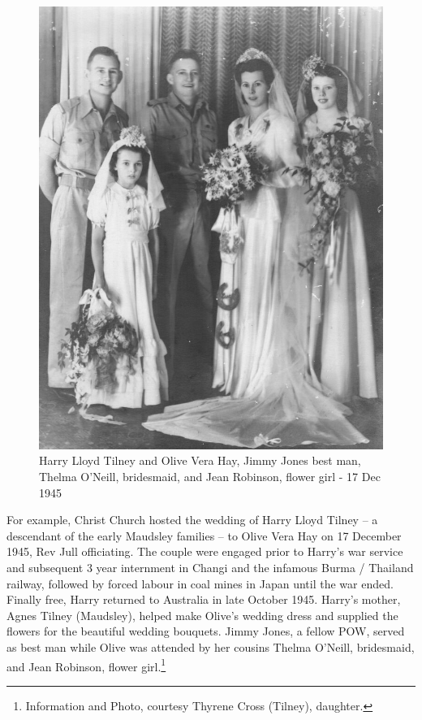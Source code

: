 \begin{figure}
\begin{center}
\includegraphics[width=1.\linewidth,center]{../images/OliveAndSnowTilneyWedding17121945.jpg}
\caption{Harry Lloyd Tilney and Olive Vera Hay, Jimmy Jones best man, Thelma O'Neill, bridesmaid, and Jean Robinson, flower girl - 17 Dec 1945}
\end{center}
\end{figure}




For example, Christ Church hosted the wedding of Harry Lloyd Tilney -- a descendant of the early Maudsley families -- to Olive Vera Hay on 17 December 1945, Rev Jull officiating. The couple were engaged prior to Harry's war service and subsequent 3  year internment in Changi and the infamous Burma / Thailand railway, followed by forced labour in coal mines in Japan until the war ended. Finally free, Harry returned to Australia in late October 1945. Harry's mother, Agnes Tilney (Maudsley), helped make Olive's wedding dress and supplied the flowers for the beautiful wedding bouquets. Jimmy Jones, a fellow POW, served as best man while Olive was attended by her cousins Thelma O'Neill, bridesmaid, and Jean Robinson, flower girl.\footnote{Information and Photo, courtesy Thyrene Cross (Tilney), daughter.}


